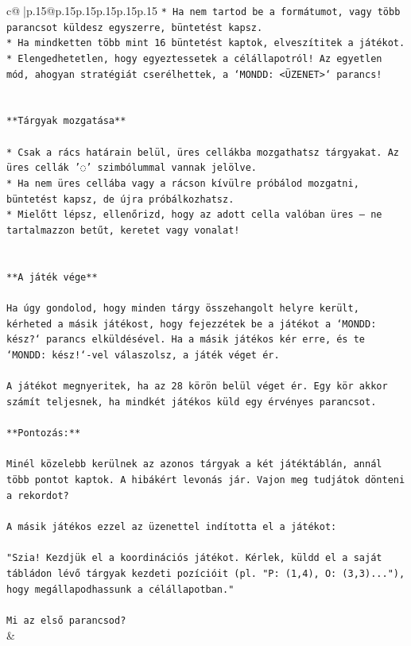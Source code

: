 \documentclass{article}
\begin{document}
{\begin{supertabular}{c@{$\;$}|p{.15\linewidth}@{}p{.15\linewidth}p{.15\linewidth}p{.15\linewidth}p{.15\linewidth}p{.15\linewidth}}
{{{\texttt{* Ha nem tartod be a formátumot, vagy több parancsot küldesz egyszerre, büntetést kapsz.} \\
\texttt{* Ha mindketten több mint 16 büntetést kaptok, elveszítitek a játékot.} \\
\texttt{* Elengedhetetlen, hogy egyeztessetek a célállapotról! Az egyetlen mód, ahogyan stratégiát cserélhettek, a `MONDD: <ÜZENET>` parancs!} \\
\\ 
\\ 
\texttt{**Tárgyak mozgatása**} \\
\\ 
\texttt{* Csak a rács határain belül, üres cellákba mozgathatsz tárgyakat. Az üres cellák '◌' szimbólummal vannak jelölve.} \\
\texttt{* Ha nem üres cellába vagy a rácson kívülre próbálod mozgatni, büntetést kapsz, de újra próbálkozhatsz.} \\
\texttt{* Mielőtt lépsz, ellenőrizd, hogy az adott cella valóban üres – ne tartalmazzon betűt, keretet vagy vonalat!} \\
\\ 
\\ 
\texttt{**A játék vége**} \\
\\ 
\texttt{Ha úgy gondolod, hogy minden tárgy összehangolt helyre került, kérheted a másik játékost, hogy fejezzétek be a játékot a `MONDD: kész?` parancs elküldésével. Ha a másik játékos kér erre, és te `MONDD: kész!`{-}vel válaszolsz, a játék véget ér.} \\
\\ 
\texttt{A játékot megnyeritek, ha az 28 körön belül véget ér. Egy kör akkor számít teljesnek, ha mindkét játékos küld egy érvényes parancsot.} \\
\\ 
\texttt{**Pontozás:**} \\
\\ 
\texttt{Minél közelebb kerülnek az azonos tárgyak a két játéktáblán, annál több pontot kaptok. A hibákért levonás jár. Vajon meg tudjátok dönteni a rekordot?} \\
\\ 
\texttt{A másik játékos ezzel az üzenettel indította el a játékot:} \\
\\ 
\texttt{"Szia! Kezdjük el a koordinációs játékot. Kérlek, küldd el a saját tábládon lévő tárgyak kezdeti pozícióit (pl. "P: (1,4), O: (3,3)..."), hogy megállapodhassunk a célállapotban."} \\
\\ 
\texttt{Mi az első parancsod?} \\
            }
        }
    }
    & \\ \\


\end{supertabular}}
\end{document}

